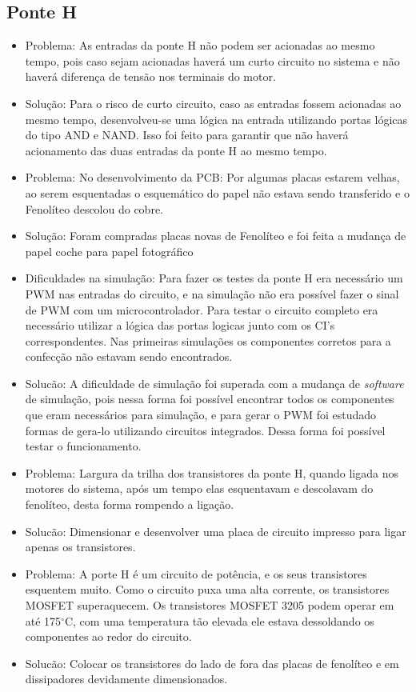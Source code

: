 \subsection{Ponte H}
 \begin{itemize}
    \item Problema: As entradas da ponte H não podem ser acionadas ao mesmo tempo, pois caso sejam acionadas haverá um curto circuito no sistema e não haverá diferença de tensão nos terminais do motor.
    \item Solução: Para o risco de curto circuito, caso as entradas fossem acionadas ao mesmo tempo, desenvolveu-se uma lógica na entrada utilizando portas lógicas do tipo AND e NAND. Isso foi feito para garantir que não haverá acionamento das duas entradas da ponte H ao mesmo tempo.

    \item Problema: No desenvolvimento da PCB: Por algumas placas estarem velhas, ao serem esquentadas o esquemático do papel não estava sendo transferido e o Fenolíteo descolou do cobre.
    \item Solução: Foram compradas placas novas de Fenolíteo e foi feita a mudança de papel coche para papel fotográfico

    \item Dificuldades na simulação: Para fazer os testes da ponte H era necessário um PWM nas entradas do circuito, e na simulação não era possível fazer o sinal de PWM com um microcontrolador. Para testar o circuito completo era necessário utilizar a lógica das portas logicas junto com os CI’s correspondentes. Nas primeiras simulações os componentes corretos para a confecção não estavam sendo encontrados.
    \item Solucão: A dificuldade de simulação foi superada com a mudança de \textit{software} de simulação, pois nessa forma foi possível encontrar todos os componentes que eram necessários para simulação, e para gerar o PWM foi estudado formas de gera-lo utilizando circuitos integrados. Dessa forma foi possível testar o funcionamento.

	\item Problema: Largura da trilha dos transistores da ponte H, quando ligada nos motores do sistema, após um tempo elas esquentavam e descolavam do fenolíteo, desta forma rompendo a ligação.
    \item Solucão: Dimensionar e desenvolver uma placa de circuito impresso para ligar apenas os transistores.

    \item Problema: A porte H é um circuito de potência, e os seus transistores esquentem muito. Como o circuito puxa uma alta corrente, os transistores MOSFET superaquecem. Os transistores MOSFET 3205 podem operar em até 175$^{\circ}$C, com uma temperatura tão elevada ele estava dessoldando os componentes ao redor do circuito.
	\item Solucão: Colocar os transistores do lado de fora das placas de fenolíteo e em dissipadores devidamente dimensionados.

    \end{itemize}

